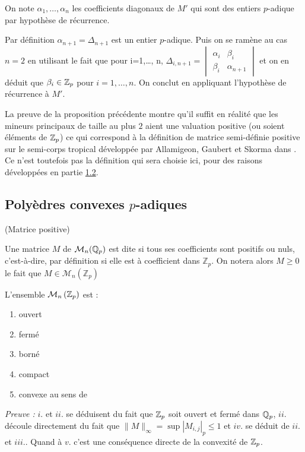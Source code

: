 On note $ \alpha_1,\ldots, \alpha_n$ les coefficients diagonaux de $M'$ qui sont des entiers $p$-adique par hypothèse de récurrence. 


 Par définition $ \alpha_{n+1} = \Delta_{n+1}$ est un entier $p$-adique. Puis on se ramène au cas $n=2$ en utilisant le fait que pour i=1,\ldots, n, $\Delta_{i,n+1} = \begin{vmatrix} \alpha_{i} & \beta_{i}\\ \beta_{i} & \alpha_{n+1} \end{vmatrix} $ et on en déduit que $\beta_{i} \in  \mathbb {Z}_p $ pour $i=1,\ldots,n$. On conclut en appliquant l'hypothèse de récurrence à $M'$.


\hfill \qedsymbol
\begin{remarque}
	
	La preuve de la proposition précédente montre qu'il suffit en réalité que les mineurs principaux de taille au plus $2$ aient une valuation positive (ou soient éléments de $ \mathbb {Z}_p $) ce qui correspond à la définition de matrice semi-définie positive sur le semi-corps tropical développée par Allamigeon, Gaubert et Skorma dans \cite{allamigeon_tropical_2020} . Ce n'est toutefois pas la définition qui sera choisie ici, pour des raisons développées en partie \hyperlink{subsection.1.2}{1.2}.
\end{remarque}




\subsection{Polyèdres convexes \texorpdfstring{$p$}{p}-adiques} 

\begin{definition}
	(Matrice positive)


	Une matrice $M$ de $\mathcal{M}_n(\mathbb{Q}_p)$ est dite  si tous ses coefficients sont positifs ou nuls, c'est-à-dire, par définition si elle est à coefficient dans $\mathbb{Z}_p$.
	On notera alors $M\ge 0$ le fait que $M \in \mathcal{M}_{n}\left(\mathbb{Z}_p\right) $

\end{definition}

\begin{propriete}
	L'ensemble $\mathcal{M}_n \left(  \mathbb {Z}_p  \right)$ est :
	\begin{enumerate}[label=\roman*.]
	\item ouvert
	\item fermé
	\item borné
	\item compact
	\item convexe au sens de \parencite{monna_ensembles_1958}
\end{enumerate}
\end{propriete}
\textit{Preuve :}
$i.$ et $ii.$ se déduisent du fait que $ \mathbb {Z}_p $ soit ouvert et fermé dans $\mathbb{Q}_p$, $ii.$ découle directement du fait que $\|M\|_\infty = \sup |M_{i,j}|_p \le 1$ et $iv.$ se déduit de $ii.$ et $iii.$.
Quand à $v.$ c'est une conséquence directe de la convexité de $ \mathbb {Z}_p $.

